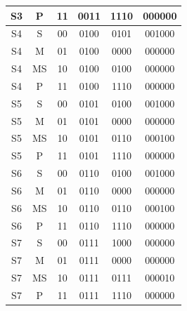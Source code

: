 \documentclass[11pt,a4paper,final]{article}
\begin{document}
\begin{center}
\begin{tabular}{|c|c|c||c|c|c|}
			S3 & P & 11 & 0011 & 1110 & 000000 \\
			\hline
			S4 & S & 00 & 0100 & 0101 & 001000 \\
			S4 & M & 01 & 0100 & 0000 & 000000 \\
			S4 & MS & 10 & 0100 & 0100 & 000000 \\
			S4 & P & 11 & 0100 & 1110 & 000000 \\
			\hline
			S5 & S & 00 & 0101 & 0100 & 001000 \\
			S5 & M & 01 & 0101 & 0000 & 000000 \\
			S5 & MS & 10 & 0101 & 0110 & 000100 \\
			S5 & P & 11 & 0101 & 1110 & 000000 \\
			\hline
			S6 & S & 00 & 0110 & 0100 & 001000 \\
			S6 & M & 01 & 0110 & 0000 & 000000 \\
			S6 & MS & 10 & 0110 & 0110 & 000100 \\
			S6 & P & 11 & 0110 & 1110 & 000000 \\
			\hline
			S7 & S & 00 & 0111 & 1000 & 000000 \\
			S7 & M & 01 & 0111 & 0000 & 000000 \\
			S7 & MS & 10 & 0111 & 0111 & 000010 \\
			S7 & P & 11 & 0111 & 1110 & 000000 \\
			\hline
			\end{tabular}
			\end{center}
			
\end{document}

